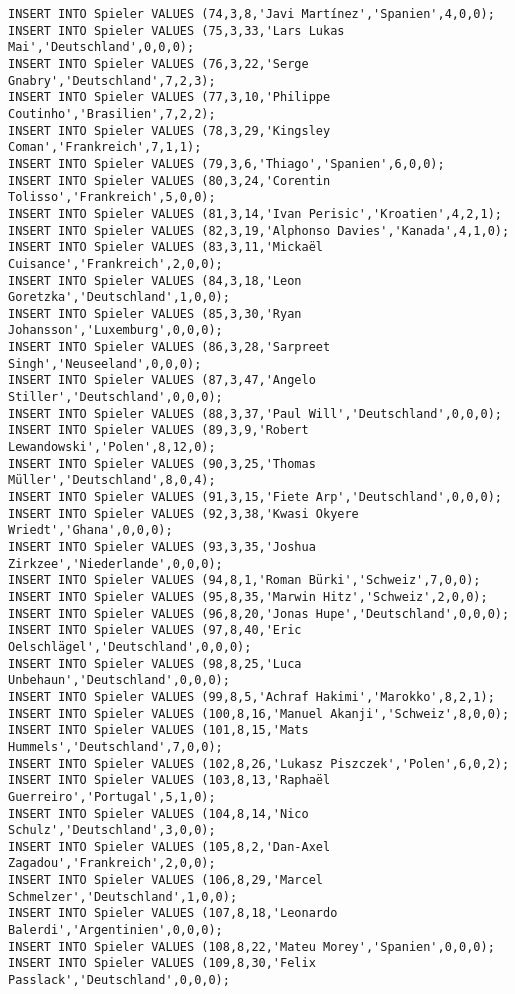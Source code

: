 \documentclass{lehramt-informatik-aufgabe}
\begin{document}
\begin{verbatim}
INSERT INTO Spieler VALUES (74,3,8,'Javi Martínez','Spanien',4,0,0);
INSERT INTO Spieler VALUES (75,3,33,'Lars Lukas Mai','Deutschland',0,0,0);
INSERT INTO Spieler VALUES (76,3,22,'Serge Gnabry','Deutschland',7,2,3);
INSERT INTO Spieler VALUES (77,3,10,'Philippe Coutinho','Brasilien',7,2,2);
INSERT INTO Spieler VALUES (78,3,29,'Kingsley Coman','Frankreich',7,1,1);
INSERT INTO Spieler VALUES (79,3,6,'Thiago','Spanien',6,0,0);
INSERT INTO Spieler VALUES (80,3,24,'Corentin Tolisso','Frankreich',5,0,0);
INSERT INTO Spieler VALUES (81,3,14,'Ivan Perisic','Kroatien',4,2,1);
INSERT INTO Spieler VALUES (82,3,19,'Alphonso Davies','Kanada',4,1,0);
INSERT INTO Spieler VALUES (83,3,11,'Mickaël Cuisance','Frankreich',2,0,0);
INSERT INTO Spieler VALUES (84,3,18,'Leon Goretzka','Deutschland',1,0,0);
INSERT INTO Spieler VALUES (85,3,30,'Ryan Johansson','Luxemburg',0,0,0);
INSERT INTO Spieler VALUES (86,3,28,'Sarpreet Singh','Neuseeland',0,0,0);
INSERT INTO Spieler VALUES (87,3,47,'Angelo Stiller','Deutschland',0,0,0);
INSERT INTO Spieler VALUES (88,3,37,'Paul Will','Deutschland',0,0,0);
INSERT INTO Spieler VALUES (89,3,9,'Robert Lewandowski','Polen',8,12,0);
INSERT INTO Spieler VALUES (90,3,25,'Thomas Müller','Deutschland',8,0,4);
INSERT INTO Spieler VALUES (91,3,15,'Fiete Arp','Deutschland',0,0,0);
INSERT INTO Spieler VALUES (92,3,38,'Kwasi Okyere Wriedt','Ghana',0,0,0);
INSERT INTO Spieler VALUES (93,3,35,'Joshua Zirkzee','Niederlande',0,0,0);
INSERT INTO Spieler VALUES (94,8,1,'Roman Bürki','Schweiz',7,0,0);
INSERT INTO Spieler VALUES (95,8,35,'Marwin Hitz','Schweiz',2,0,0);
INSERT INTO Spieler VALUES (96,8,20,'Jonas Hupe','Deutschland',0,0,0);
INSERT INTO Spieler VALUES (97,8,40,'Eric Oelschlägel','Deutschland',0,0,0);
INSERT INTO Spieler VALUES (98,8,25,'Luca Unbehaun','Deutschland',0,0,0);
INSERT INTO Spieler VALUES (99,8,5,'Achraf Hakimi','Marokko',8,2,1);
INSERT INTO Spieler VALUES (100,8,16,'Manuel Akanji','Schweiz',8,0,0);
INSERT INTO Spieler VALUES (101,8,15,'Mats Hummels','Deutschland',7,0,0);
INSERT INTO Spieler VALUES (102,8,26,'Lukasz Piszczek','Polen',6,0,2);
INSERT INTO Spieler VALUES (103,8,13,'Raphaël Guerreiro','Portugal',5,1,0);
INSERT INTO Spieler VALUES (104,8,14,'Nico Schulz','Deutschland',3,0,0);
INSERT INTO Spieler VALUES (105,8,2,'Dan-Axel Zagadou','Frankreich',2,0,0);
INSERT INTO Spieler VALUES (106,8,29,'Marcel Schmelzer','Deutschland',1,0,0);
INSERT INTO Spieler VALUES (107,8,18,'Leonardo Balerdi','Argentinien',0,0,0);
INSERT INTO Spieler VALUES (108,8,22,'Mateu Morey','Spanien',0,0,0);
INSERT INTO Spieler VALUES (109,8,30,'Felix Passlack','Deutschland',0,0,0);

\end{verbatim}
\end{document}
